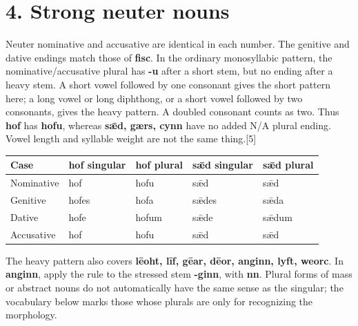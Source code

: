 \section*{4. Strong neuter nouns}

Neuter nominative and accusative are identical in each number. The genitive and dative endings match those of \textbf{fisc}. In the ordinary monosyllabic pattern, the nominative/\allowbreak{}accusative plural has \textbf{-u} after a short stem, but no ending after a heavy stem. A short vowel followed by one consonant gives the short pattern here; a long vowel or long diphthong, or a short vowel followed by two consonants, gives the heavy pattern. A doubled consonant counts as two. Thus \textbf{hof} has \textbf{hofu}, whereas \textbf{sǣd, gærs, cynn} have no added N/\allowbreak{}A plural ending. Vowel length and syllable weight are not the same thing.[5]

\par\begingroup
\fontsize{10.5}{13.2}\selectfont
\setlength{\LTleft}{0pt}\setlength{\LTright}{\fill}
\noindent
\begin{tabular}{@{}>{\raggedright\arraybackslash}p{22.0mm}>{\raggedright\arraybackslash}p{22.688mm}>{\raggedright\arraybackslash}p{22.688mm}>{\raggedright\arraybackslash}p{22.688mm}>{\raggedright\arraybackslash}p{22.688mm}@{}}
\toprule
\textbf{Case} & \textbf{hof singular} & \textbf{hof plural} & \textbf{sǣd singular} & \textbf{sǣd plural} \\
\midrule
Nominative & hof & hofu & sǣd & sǣd \\
Genitive & hofes & hofa & sǣdes & sǣda \\
Dative & hofe & hofum & sǣde & sǣdum \\
Accusative & hof & hofu & sǣd & sǣd \\
\bottomrule
\end{tabular}
\par\endgroup

The heavy pattern also covers \textbf{lēoht, līf, gēar, dēor, anginn, lyft, weorc}. In \textbf{anginn}, apply the rule to the stressed stem \textbf{-ginn}, with \textbf{nn}. Plural forms of mass or abstract nouns do not automatically have the same sense as the singular; the vocabulary below marks those whose plurals are only for recognizing the morphology.

